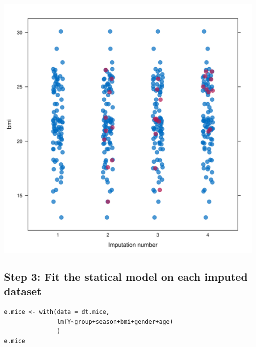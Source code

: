 \documentclass[12pt]{article}
\begin{document}
\begin{center}
\includegraphics[width=.9\linewidth]{./striplotImputed.pdf}
\end{center}

\clearpage

\subsection{Step 3: Fit the statical model on each imputed dataset}
\label{sec:org7e31945}

\lstset{language=r,label= ,caption= ,captionpos=b,numbers=none}
\begin{lstlisting}
e.mice <- with(data = dt.mice,
			   lm(Y~group+season+bmi+gender+age)
			   )
e.mice
\end{lstlisting}
\end{document}

